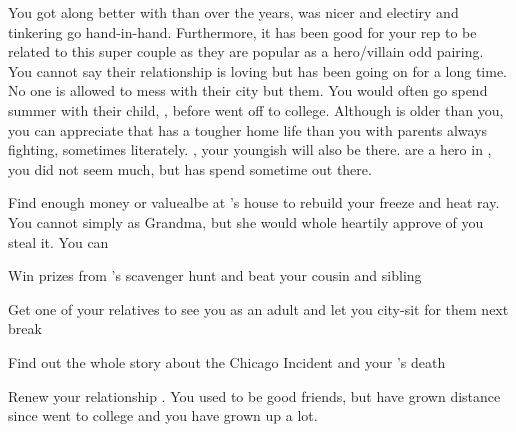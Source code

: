 \documentclass[char]{LRSguildcamp1}
\begin{document}
You got along better with \cOS{} than \cOldest{} over the years, \cOS{\they} was nicer and electiry and tinkering go hand-in-hand. Furthermore, it has been good for your rep to be related to this super couple as they are popular as a hero/villain odd pairing. You cannot say their relationship is loving but has been going on for a long time. No one is allowed to mess with their city but them.  You would often go spend summer with their child, \cGrad{}, before \cGrad{\they} went off to college. Although \cGrad{} is older than you, you can appreciate that \cGrad{} has a tougher home life than you with parents always fighting, sometimes literately. \cYoungest{}, your youngish \cYoungest{\uncle} will also be there.  are a hero in \pCityYoungest{}, you did not seem \cYoungest{\them} much, but \cTween{} has spend sometime out there. 


 
\begin{itemz}[Goals]
	\item Find enough money or valuealbe at \cGrandma{}'s house to rebuild your freeze and heat ray. You cannot simply as Grandma, but she would whole heartily approve of you steal it.  You can 
	
		\item Win prizes from \cGrandma{}'s scavenger hunt and beat your cousin and sibling
		\item Get one of your relatives to see you as an adult and let you city-sit for them next break
		\item Find out the whole story about the Chicago Incident and your \cAS{\parent}'s death
		\item Renew your relationship \cGrad{}. You used to be good friends, but have grown distance since \cGrad{} went to college and you have grown up a lot.
\end{itemz}
\end{document}

